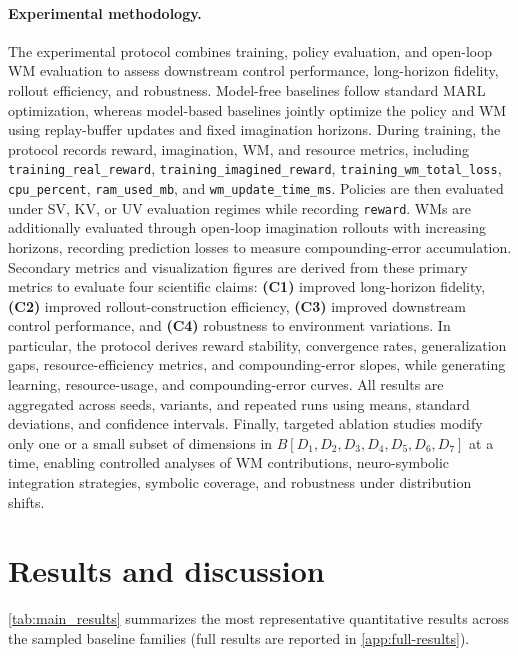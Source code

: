 \documentclass{article}
\theoremstyle{plain}
\theoremstyle{definition}
\theoremstyle{remark}
\begin{document}
\paragraph{Experimental methodology.}
The experimental protocol combines training, policy evaluation, and open-loop WM evaluation to assess downstream control performance, long-horizon fidelity, rollout efficiency, and robustness. Model-free baselines follow standard MARL optimization, whereas model-based baselines jointly optimize the policy and WM using replay-buffer updates and fixed imagination horizons. During training, the protocol records reward, imagination, WM, and resource metrics, including \texttt{training\_real\_reward}, \texttt{training\_imagined\_reward}, \texttt{training\_wm\_total\_loss}, \texttt{cpu\_percent}, \texttt{ram\_used\_mb}, and \texttt{wm\_update\_time\_ms}. Policies are then evaluated under SV, KV, or UV evaluation regimes while recording \texttt{reward}. WMs are additionally evaluated through open-loop imagination rollouts with increasing horizons, recording prediction losses to measure compounding-error accumulation. Secondary metrics and visualization figures are derived from these primary metrics to evaluate four scientific claims: \textbf{(C1)} improved long-horizon fidelity, \textbf{(C2)} improved rollout-construction efficiency, \textbf{(C3)} improved downstream control performance, and \textbf{(C4)} robustness to environment variations. In particular, the protocol derives reward stability, convergence rates, generalization gaps, resource-efficiency metrics, and compounding-error slopes, while generating learning, resource-usage, and compounding-error curves. All results are aggregated across seeds, variants, and repeated runs using means, standard deviations, and confidence intervals. Finally, targeted ablation studies modify only one or a small subset of dimensions in $B[D_1,D_2,D_3,D_4,D_5,D_6,D_7]$ at a time, enabling controlled analyses of WM contributions, neuro-symbolic integration strategies, symbolic coverage, and robustness under distribution shifts.


\section{Results and discussion}
\label{sec:results}

\autoref{tab:main_results} summarizes the most representative quantitative results across the sampled baseline families (full results are reported in \autoref{app:full-results}).
\end{document}
